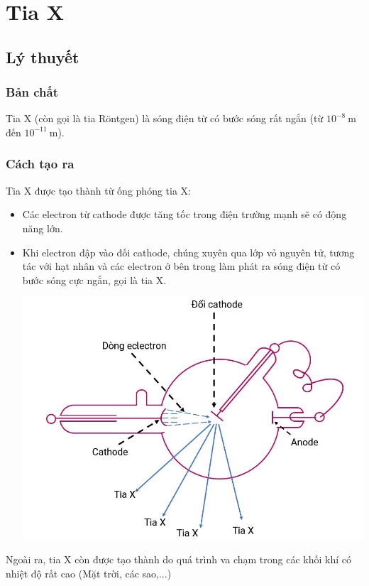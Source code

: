 
\chapter[Tia X]{Tia X}
\section{Lý thuyết}
\subsection{Bản chất}

Tia X (còn gọi là tia R\"ontgen) là sóng điện từ có bước sóng rất ngắn (từ $10^{-8}\ \text{m}$ đến $10^{-11}\ \text{m}$).

\subsection {Cách tạo ra}
Tia X được tạo thành từ ống phóng tia X:
\begin{itemize}
	\item Các electron từ cathode được tăng tốc trong điện trường mạnh sẽ có động năng lớn.
	\item Khi electron đập vào đối cathode, chúng xuyên qua lớp vỏ nguyên tử, tương tác với hạt nhân và các electron ở bên trong làm phát ra sóng điện từ có bước sóng cực ngắn, gọi là tia X.
	
	\begin{center}
		\includegraphics[scale=0.5]{../figs/VN12-PH-36-L-021-5-1.JPG}
	\end{center}
\end{itemize}
Ngoài ra, tia X còn được tạo thành do quá trình va chạm trong các khối khí có nhiệt độ rất cao (Mặt trời, các sao,...)
